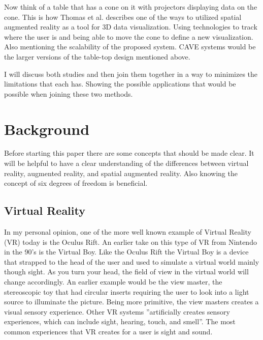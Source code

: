 \documentclass{sig-alternate}
\begin{document}
Now think of a table that has a cone on it with projectors displaying data on the cone. This is how Thomas et al. describes one of the ways to utilized spatial augmented reality as a tool for 3D data visualization. Using technologies to track where the user is and being able to move the cone to define a new visualization. Also mentioning the scalability of the proposed system. CAVE systems would be the larger versions of the table-top design mentioned above.      

I will discuss both studies and then join them together in a way to minimizes the limitations that each has. Showing the possible applications that would be possible when joining these two methods.       


\section{Background}
\label{sec:background} 
Before starting this paper there are some concepts that should be made clear. It will be helpful to have a clear understanding of the differences between virtual reality, augmented reality, and spatial augmented reality. Also knowing the concept of six degrees of freedom is beneficial.  

\subsection{Virtual Reality}
\label{sec:Virtual Reality}
In my personal opinion, one of the more well known example of Virtual Reality (VR) today is the Oculus Rift. An earlier take on this type of VR from Nintendo in the 90's is the Virtual Boy. Like the Oculus Rift the Virtual Boy is a device that strapped to the head of the user and used to simulate a virtual world mainly though sight. As you turn your head, the field of view in the virtual world will change accordingly. An earlier example would be the view master, the stereoscopic toy that had circular inserts requiring the user to look into a light source to illuminate the picture. Being more primitive, the view masters creates a visual sensory experience. Other VR systems ''artificially creates sensory experiences, which can include sight, hearing, touch, and smell''\cite{VR}. The most common experiences that VR creates for a user is sight and sound.       
\end{document}

